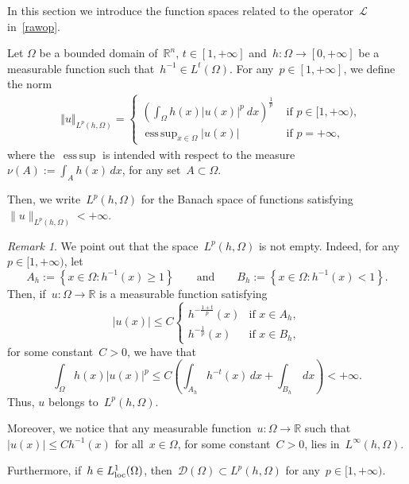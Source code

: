 \documentclass[11pt,hyp,]{nyjm}
\numberwithin{equation}{section}
\newcommand{\R}{\mathbb{R}}
\theoremstyle{remark}
\newtheorem{remark}[theorem]{Remark}
\DeclareMathOperator*{\esssup}{ess\,sup}
\renewcommand{\leq}{\leqslant}
\renewcommand{\geq}{\geqslant}
\begin{document}
In this section we introduce the function spaces related to the operator~$\mathcal{L}$ in~\eqref{rawop}.

Let $\Omega$ be a bounded domain of~$\R^n$, $t \in[ 1,+\infty]$
and~$h:\Omega\to[0,+\infty]$ be a measurable function such that~$h^{-1} \in L^t(\Omega)$.  For any~$p \in [1, +\infty]$,
we define the norm
	\begin{align*}
				&\Vert u \Vert_{L^p(h, \Omega)} = \begin{cases}
					\left( \displaystyle\int_{\Omega} h (x)|u(x)|^p \ dx \right)^{\frac{1}{p}}  & \mbox{ if } p \in [1, +\infty) ,\\  \displaystyle
					\esssup_{x \in \Omega} |u(x)|  & \mbox{ if } p = +\infty,
				\end{cases} 
			\end{align*}
			where the~$\esssup$ is intended with respect to the measure~$\nu(A):= \int_{A} h(x) \, dx$, for any set~$A \subset \Omega$.


Then, we write~$L^p(h, \Omega)$ for the Banach space of functions satisfying $\| u \|_{L^p(h, \Omega)}<+\infty$.

\begin{remark}\label{vozzi}
We point out that the space~$L^p(h, \Omega)$ is not empty. Indeed, for any~$p \in [1, +\infty)$, let
\begin{equation}
A_{h}:= \left\{ x\in \Omega: h^{-1}(x) \geq 1 \right\} \qquad\mbox{and}\qquad B_{h}:= \left\{ x\in\Omega: h^{-1}(x) < 1 \right\}.
\end{equation}
Then, if~$u:\Omega\to\R$ is a measurable function satisfying
\begin{equation}
|u(x)| \leq C \begin{cases}
h^{- \frac{1+t}{p}}(x) &\mbox{if } x\in A_h, \\
h^{- \frac{1}{p}}(x) &\mbox{if } x\in B_h,
\end{cases}
\end{equation}
for some constant~$C>0$,  we have that
\begin{equation*}
\int_{\Omega} h(x) |u(x)|^{p} 
\leq C \left( \int_{A_h} h^{-t}(x) \, dx + \int_{B_h} \, dx\right) < +\infty.
\end{equation*} 
Thus, $u$ belongs to~$L^p(h, \Omega)$. 

Moreover, we notice that any measurable function~$u:\Omega\to\R$ such that~$ |u(x)| \leq C h^{-1}(x)$ for all~$x\in\Omega$, for some constant~$C>0$, lies in~$L^{\infty}(h, \Omega)$.

Furthermore, if~$h \in L^1_{\rm loc}(\Omega)$, then~$\mathcal{D}(\Omega) \subset L^p(h, \Omega)$ for any~$p \in [1, +\infty)$.
\end{remark} 
\end{document}
